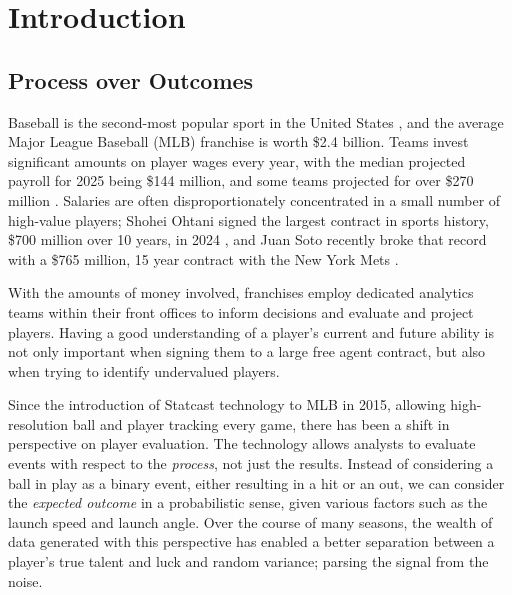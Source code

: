 \documentclass[12pt, TexShade, letterpaper]{report}
\begin{document}


\setlength{\voffset}{2cm}
\renewcommand{\chaptermark}[1]{%
	\markboth{\thechapter.\ #1}{}}

	\tableofcontents\thispagestyle{plain}
    \clearpage

\chapter{Introduction}
\section{Process over Outcomes}
Baseball is the second-most popular sport in the United States \cite{gallupPoll}, and the average Major League Baseball (MLB) franchise is worth \$2.4 billion. Teams invest significant amounts on player wages every year, with the median projected payroll for 2025 being \$144 million, and some teams projected for over \$270 million \cite{fgRosterResource}. Salaries are often disproportionately concentrated in a small number of high-value players; Shohei Ohtani signed the largest contract in sports history, \$700 million over 10 years, in 2024 \cite{ohtaniContract}, and Juan Soto recently broke that record with a \$765 million, 15 year contract with the New York Mets \cite{sotoContract}.

With the amounts of money involved, franchises employ dedicated analytics teams within their front offices to inform decisions and evaluate and project players. Having a good understanding of a player's current and future ability is not only important when signing them to a large free agent contract, but also when trying to identify undervalued players.

Since the introduction of Statcast technology to MLB in 2015, allowing high-resolution ball and player tracking every game, there has been a shift in perspective on player evaluation. The technology allows analysts to evaluate events with respect to the \textit{process}, not just the results. Instead of considering a ball in play as a binary event, either resulting in a hit or an out, we can consider the \textit{expected outcome} in a probabilistic sense, given various factors such as the launch speed and launch angle. Over the course of many seasons, the wealth of data generated with this perspective has enabled a better separation between a player's true talent and luck and random variance; parsing the signal from the noise.
\end{document}
